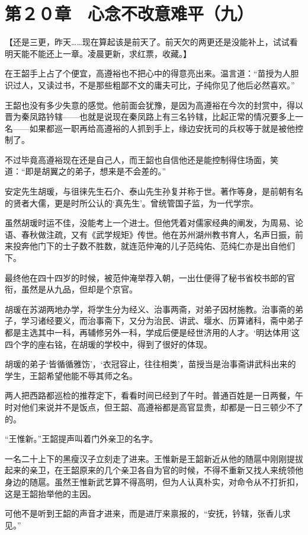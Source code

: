 \section{第２０章　心念不改意难平（九）}

【还是三更，昨天……现在算起该是前天了。前天欠的两更还是没能补上，试试看明天能不能还上一章。凌晨更新，求红票，收藏。】

在王韶手上占了个便宜，高遵裕也不把心中的得意亮出来。温言道：“苗授为人胆识过人，又读过书，不是那些粗鄙不文的庸夫可比，子纯你见了他后必然喜欢。”

王韶也没有多少失意的感觉。他前面会犹豫，是因为高遵裕在今次的封赏中，得以晋为秦凤路钤辖——也就是说现在秦凤路上有三名钤辖，比起正常的情况要多上一名——如果都巡一职再给高遵裕的人抓到手上，缘边安抚司的兵权等于就是被他控制了。

不过毕竟高遵裕现在还是自己人，而王韶也自信他还是能控制得住场面，笑道：“即是胡翼之的弟子，想来是不会差的。”

安定先生胡瑗，与徂徕先生石介、泰山先生孙复并称于世。著作等身，是前朝有名的贤者大儒，更是时所公认的‘真先生’。曾统管国子监，为一代学宗。

虽然胡瑗时运不佳，没能考上一个进士。但他凭着对儒家经典的阐发，为周易、论语、春秋做注疏，又有《武学规矩》传世。他在苏州湖州教书育人，名声日振，前来投奔他门下的士子数不胜数，就连范仲淹的儿子范纯佑、范纯仁亦是出自他们下。

最终他在四十四岁的时候，被范仲淹举荐入朝，一出仕便得了秘书省校书郎的官衔，虽然是从九品，但却是个京官。

胡瑗在苏湖两地办学，将学生分为经义、治事两斋，对弟子因材施教。治事斋的弟子，学习诸经要义，而治事斋下，又分为治民、讲武、堰水、历算诸科，斋中弟子都是主选其中一科，再辅修另外一科，学成后便是经世济用的人才。‘明达体用’这四个字的座右铭，在胡瑗的学校中，得到了很好的体现。

胡瑗的弟子‘皆循循雅饬’，‘衣冠容止，往往相类’，苗授当是治事斋讲武科出来的学生，王韶希望他能不辱其师之名。

两人把西路都巡检的推荐定下，看看时间已经到了午时。普通百姓是一日两餐，午时对他们来说并不是饭点，但王韶、高遵裕都是高官显贵，却都是一日三顿少不了的。

“王惟新。”王韶提声叫着门外亲卫的名字。

一名二十上下的黑瘦汉子立刻走了进来。王惟新是王韶新近从他的随扈中刚刚提拔起来的亲卫，在王韶原来的几个亲卫各自为官的时候，不得不重新又找人来统领他身边的随扈。虽然王惟新武艺算不得高明，但为人认真朴实，对命令从不打折扣，这是王韶抬举他的主因。

可他不是听到王韶的声音才进来，而是进厅来禀报的，“安抚，钤辖，张香儿求见。”

